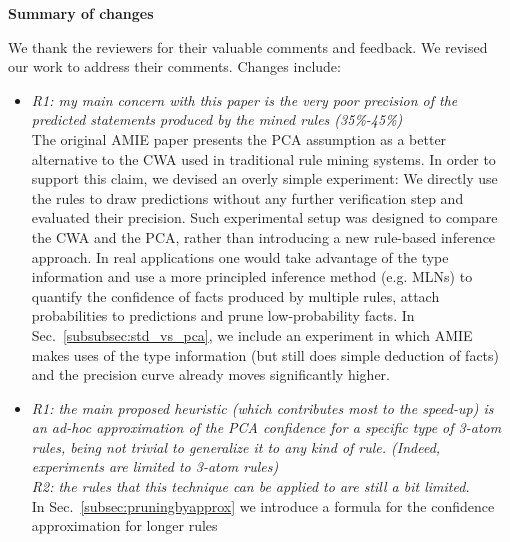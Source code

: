 \begin{figure*}[t!]
\hspace{.1\textwidth}
\begin{minipage}{.8\textwidth}
  \begin{centering}
   \LARGE\textbf{Summary of changes}
    \vspace{.3em}
  \end{centering}
  \large  
  We thank the reviewers for their valuable comments and feedback. We revised our work to address their comments. Changes include:
  
  \begin{itemize}
  
    \item \textit{R1: my main concern with this paper is the very poor precision of the predicted statements produced by the mined rules (35\%-45\%)\\  }
    The original AMIE paper presents the PCA assumption as a better alternative to the CWA used in traditional rule mining systems. In order to support this claim,
    we devised an overly simple experiment: We directly use the rules to draw predictions without any further verification
    step and evaluated their precision.
    Such experimental setup was designed to compare the CWA and the PCA, rather than introducing a new rule-based
    inference approach. In real applications one would take advantage of the type information and use 
    a more principled inference method (e.g. MLNs) to quantify the confidence of facts produced by multiple rules, 
    attach probabilities to predictions and prune low-probability facts. In Sec.~\ref{subsubsec:std_vs_pca}, we include 
    an experiment in which AMIE makes uses of the type information (but still does simple deduction of facts)
    and the precision curve already moves significantly higher. 
    
  
   \item \textit{R1: the main proposed heuristic (which contributes most to the  speed-up) is an ad-hoc approximation of 
   the PCA confidence for a specific type of 3-atom rules, being not trivial to generalize it to any kind of rule. 
   (Indeed, experiments are limited to 3-atom rules)\\
   R2: the rules that this technique can be applied to are still a bit limited. \\   }
   In Sec.~\ref{subsec:pruningbyapprox} we introduce a formula for the confidence approximation for longer rules
   

\end{itemize}
\end{minipage}
\end{figure*}
